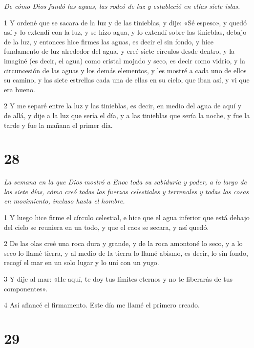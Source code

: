 \par \textit{De cómo Dios fundó las aguas, las rodeó de luz y estableció en ellas siete islas.}

\par 1 Y ordené que se sacara de la luz y de las tinieblas, y dije: «Sé espeso», y quedó así y lo extendí con la luz, y se hizo agua, y lo extendí sobre las tinieblas, debajo de la luz, y entonces hice firmes las aguas, es decir el sin fondo, y hice fundamento de luz alrededor del agua, y creé siete círculos desde dentro, y la imaginé (es decir, el agua) como cristal mojado y seco, es decir como vidrio, y la circuncesión de las aguas y los demás elementos, y les mostré a cada uno de ellos su camino, y las siete estrellas cada una de ellas en su cielo, que iban así, y vi que era bueno.

\par 2 Y me separé entre la luz y las tinieblas, es decir, en medio del agua de aquí y de allá, y dije a la luz que sería el día, y a las tinieblas que sería la noche, y fue la tarde y fue la mañana el primer día.

\chapter{28}

\par \textit{La semana en la que Dios mostró a Enoc toda su sabiduría y poder, a lo largo de los siete días, cómo creó todas las fuerzas celestiales y terrenales y todas las cosas en movimiento, incluso hasta el hombre.}

\par 1 Y luego hice firme el círculo celestial, e hice que el agua inferior que está debajo del cielo se reuniera en un todo, y que el caos se secara, y así quedó.

\par 2 De las olas creé una roca dura y grande, y de la roca amontoné lo seco, y a lo seco lo llamé tierra, y al medio de la tierra lo llamé abismo, es decir, lo sin fondo, recogí el mar en un solo lugar y lo uní con un yugo.

\par 3 Y dije al mar: «He aquí, te doy tus límites eternos y no te liberarás de tus componentes».

\par 4 Así afiancé el firmamento. Este día me llamé el primero creado.

\chapter{29}

